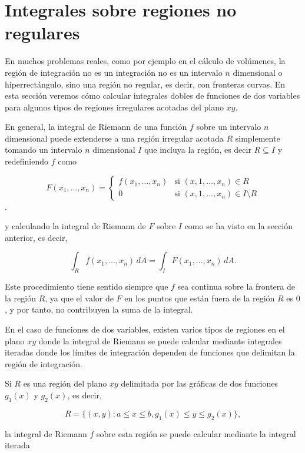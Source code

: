 \documentclass[
  a4paper,
]{scrreport}
\theoremstyle{plain}
\theoremstyle{definition}
\theoremstyle{plain}
\theoremstyle{plain}
\theoremstyle{definition}
\theoremstyle{definition}
\theoremstyle{remark}
\begin{document}
\section{Integrales sobre regiones no
regulares}\label{integrales-sobre-regiones-no-regulares}

En muchos problemas reales, como por ejemplo en el cálculo de volúmenes,
la región de integración no es un integración no es un intervalo \(n\)
dimensional o hiperrectángulo, sino una región no regular, es decir, con
fronteras curvas. En esta sección veremos cómo calcular integrales
dobles de funciones de dos variables para algunos tipos de regiones
irregulares acotadas del plano \(xy\).

En general, la integral de Riemann de una función \(f\) sobre un
intervalo \(n\) dimensional puede extenderse a una región irregular
acotada \(R\) simplemente tomando un intervalo \(n\) dimensional \(I\)
que incluya la región, es decir \(R\subseteq I\) y redefiniendo \(f\)
como

\[
F(x_1,\ldots,x_n) =
\begin{cases}
f(x_1,\ldots,x_n) & \mbox{si $(x,1,\ldots,x_n)\in R$}\\
0 & \mbox{si $(x,1,\ldots,x_n)\in I\setminus R$}
\end{cases}
\].

y calculando la integral de Riemann de \(F\) sobre \(I\) como se ha
visto en la sección anterior, es decir,

\[
\int_{R} f(x_1,\ldots,x_n)\,dA 
= \int_{I} F(x_1,\ldots,x_n)\,dA. 
\]

Este procedimiento tiene sentido siempre que \(f\) sea continua sobre la
frontera de la región \(R\), ya que el valor de \(F\) en los puntos que
están fuera de la región \(R\) es \(0\), y por tanto, no contribuyen la
suma de la integral.

En el caso de funciones de dos variables, existen varios tipos de
regiones en el plano \(xy\) donde la integral de Riemann se puede
calcular mediante integrales iteradas donde los límites de integración
dependen de funciones que delimitan la región de integración.

Si \(R\) es una región del plano \(xy\) delimitada por las gráficas de
dos funciones \(g_1(x)\) y \(g_2(x)\), es decir,

\[
R = \{(x,y): a\leq x \leq b, g_1(x)\leq y \leq g_2(x)\},
\]

la integral de Riemann \(f\) sobre esta región se puede calcular
mediante la integral iterada
\end{document}
